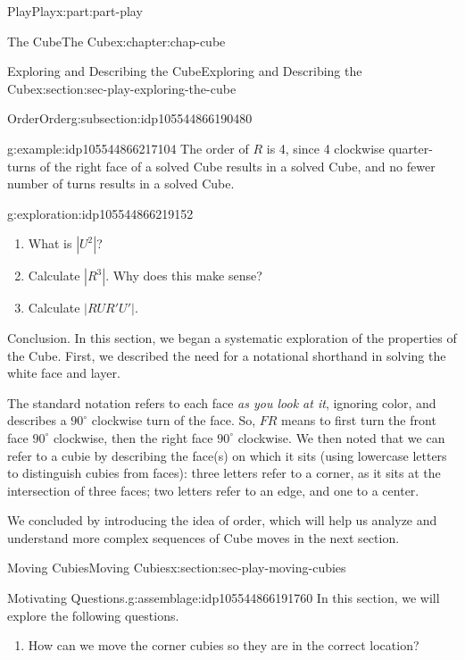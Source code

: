 \documentclass[oneside,10pt,]{book}
\numberwithin{equation}{section}
\begin{document}
\begin{partptx}{Play}{}{Play}{}{}{x:part:part-play}
\begin{chapterptx}{The Cube}{}{The Cube}{}{}{x:chapter:chap-cube}
\begin{sectionptx}{Exploring and Describing the Cube}{}{Exploring and Describing the Cube}{}{}{x:section:sec-play-exploring-the-cube}
\begin{subsectionptx}{Order}{}{Order}{}{}{g:subsection:idp105544866190480}
\begin{example}{}{g:example:idp105544866217104}%
The order of \(R\) is 4, since 4 clockwise quarter-turns of the right face of a solved Cube results in a solved Cube, and no fewer number of turns results in a solved Cube.%
\end{example}
\begin{exploration}{}{g:exploration:idp105544866219152}%
%
\begin{enumerate}
\item{}What is \(|U^2|\)?%
\item{}Calculate \(|R^3|\). Why does this make sense?%
\item{}Calculate \(|RUR' U '|\).%
\end{enumerate}
\end{exploration}%
\end{subsectionptx}
\begin{conclusion}{Conclusion.}%
In this section, we began a systematic exploration of the properties of the Cube. First, we described the need for a notational shorthand in solving the white face and layer.%
\par
The standard notation refers to each face \emph{as you look at it}, ignoring color, and describes a \(90^\circ\) clockwise turn of the face. So, \(FR\) means to first turn the front face \(90^\circ\) clockwise, then the right face \(90^\circ\) clockwise. We then noted that we can refer to a cubie by describing the face(s) on which it sits (using lowercase letters to distinguish cubies from faces): three letters refer to a corner, as it sits at the intersection of three faces; two letters refer to an edge, and one to a center.%
\par
We concluded by introducing the idea of order, which will help us analyze and understand more complex sequences of Cube moves in the next section.%
\end{conclusion}%
\end{sectionptx}
%
%
\typeout{************************************************}
\typeout{************************************************}
%
\begin{sectionptx}{Moving Cubies}{}{Moving Cubies}{}{}{x:section:sec-play-moving-cubies}
\begin{assemblage}{Motivating Questions.}{g:assemblage:idp105544866191760}%
In this section, we will explore the following questions. %
\begin{enumerate}
\item{}How can we move the corner cubies so they are in the correct location?%

\end{enumerate}
\end{assemblage}
\end{sectionptx}
\end{chapterptx}
\end{partptx}
\end{document}
